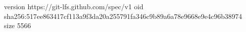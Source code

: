 version https://git-lfs.github.com/spec/v1
oid sha256:517ee863417cf113a9f3da20a255791fa346c9b89a6a78e9668e9e4c96b38974
size 5566
